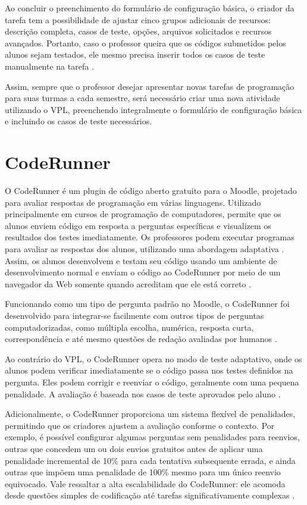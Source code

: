 Ao concluir o preenchimento do formulário de configuração básica, o criador da tarefa tem a possibilidade de ajustar cinco grupos adicionais de recursos: descrição completa, casos de teste, opções, arquivos solicitados e recursos avançados. Portanto, caso o professor queira que os códigos submetidos pelos alunos sejam testados, ele mesmo precisa inserir todos os casos de teste manualmente na tarefa \cite{vpl}.

Assim, sempre que o professor desejar apresentar novas tarefas de programação para suas turmas a cada semestre, será necessário criar uma nova atividade utilizando o VPL, preenchendo integralmente o formulário de configuração básica e incluindo os casos de teste necessários.

\section{CodeRunner}

O CodeRunner é um plugin de código aberto gratuito para o Moodle, projetado para avaliar respostas de programação em várias linguagens. Utilizado principalmente em cursos de programação de computadores, permite que os alunos enviem código em resposta a perguntas específicas e visualizem os resultados dos testes imediatamente. Os professores podem executar programas para avaliar as respostas dos alunos, utilizando uma abordagem adaptativa \cite{coderunner}. Assim, os alunos desenvolvem e testam seu código usando um ambiente de desenvolvimento normal e enviam o código ao CodeRunner por meio de um navegador da Web somente quando acreditam que ele está correto \cite[p.~47]{lobbharlow}.

Funcionando como um tipo de pergunta padrão no Moodle, o CodeRunner foi desenvolvido para integrar-se facilmente com outros tipos de perguntas computadorizadas, como múltipla escolha, numérica, resposta curta, correspondência e até mesmo questões de redação avaliadas por humanos \cite[p.~48]{lobbharlow}. 

Ao contrário do VPL, o CodeRunner opera no modo de teste adaptativo, onde os alunos podem verificar imediatamente se o código passa nos testes definidos na pergunta. Eles podem corrigir e reenviar o código, geralmente com uma pequena penalidade. A avaliação é baseada nos casos de teste aprovados pelo aluno \cite{moodle}.

 Adicionalmente, o CodeRunner proporciona um sistema flexível de penalidades, permitindo que os criadores ajustem a avaliação conforme o contexto. Por exemplo, é possível configurar algumas perguntas sem penalidades para reenvios, outras que concedem um ou dois envios gratuitos antes de aplicar uma penalidade incremental de 10\% para cada tentativa subsequente errada, e ainda outras que impõem uma penalidade de 100\% mesmo para um único reenvio equivocado. Vale ressaltar a alta escalabilidade do CodeRunner: ele acomoda desde questões simples de codificação até tarefas significativamente complexas \cite[p.~48]{lobbharlow}.
 
